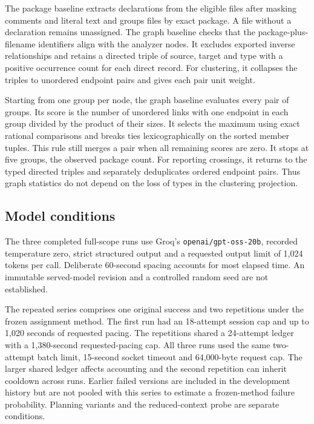 The package baseline extracts declarations from the eligible files after masking comments and literal text and groups files by exact package. A file without a declaration remains unassigned. The graph baseline checks that the package-plus-filename identifiers align with the analyzer nodes. It excludes exported inverse relationships and retains a directed triple of source, target and type with a positive occurrence count for each direct record. For clustering, it collapses the triples to unordered endpoint pairs and gives each pair unit weight.

Starting from one group per node, the graph baseline evaluates every pair of groups. Its score is the number of unordered links with one endpoint in each group divided by the product of their sizes. It selects the maximum using exact rational comparisons and breaks ties lexicographically on the sorted member tuples. This rule still merges a pair when all remaining scores are zero. It stops at five groups, the observed package count. For reporting crossings, it returns to the typed directed triples and separately deduplicates ordered endpoint pairs. Thus graph statistics do not depend on the loss of types in the clustering projection.

\subsection{Model conditions}

The three completed full-scope runs use Groq's \texttt{openai/\allowbreak{}gpt-\allowbreak{}oss-\allowbreak{}20b}, recorded temperature zero, strict structured output and a requested output limit of 1,024 tokens per call. Deliberate 60-second spacing accounts for most elapsed time. An immutable served-model revision and a controlled random seed are not established.

The repeated series comprises one original success and two repetitions under the frozen assignment method. The first run had an 18-attempt session cap and up to 1,020 seconds of requested pacing. The repetitions shared a 24-attempt ledger with a 1,380-second requested-pacing cap. All three runs used the same two-attempt batch limit, 15-second socket timeout and 64,000-byte request cap. The larger shared ledger affects accounting and the second repetition can inherit cooldown across runs. Earlier failed versions are included in the development history but are not pooled with this series to estimate a frozen-method failure probability. Planning variants and the reduced-context probe are separate conditions.

